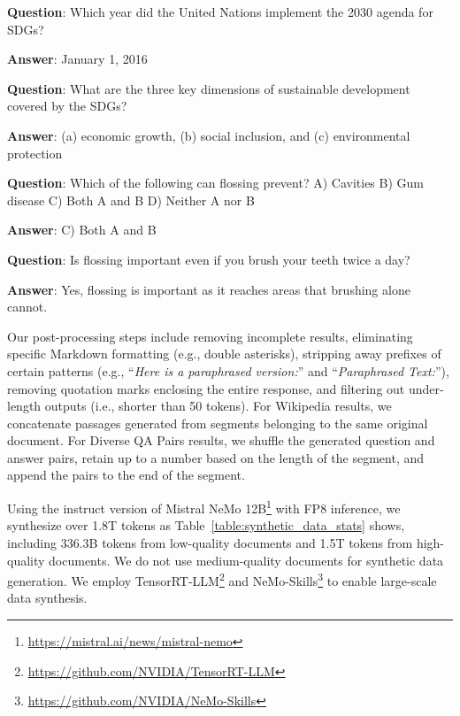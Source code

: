\documentclass[11pt]{article}
\begin{document}
\begin{tcolorbox}[boxsep=0mm,left=1mm,right=1mm,top=1mm,bottom=1mm,fontupper=\small\ttfamily,halign=left,arc=0mm,boxrule=1pt,colback=gray!10]
\textbf{Question}: Which year did the United Nations implement the 2030 agenda for SDGs?

\textbf{Answer}: January 1, 2016

\vspace{4pt}

\textbf{Question}: What are the three key dimensions of sustainable development covered by the SDGs?

\textbf{Answer}: (a) economic growth, (b) social inclusion, and (c) environmental protection

\vspace{4pt}

\textbf{Question}: Which of the following can flossing prevent? A) Cavities B) Gum disease C) Both A and B D) Neither A nor B

\textbf{Answer}: C) Both A and B

\vspace{4pt}

\textbf{Question}: Is flossing important even if you brush your teeth twice a day?

\textbf{Answer}: Yes, flossing is important as it reaches areas that brushing alone cannot.
\end{tcolorbox}
\noindent\begin{minipage}{\linewidth}
\end{minipage}

Our post-processing steps include removing incomplete results, eliminating specific Markdown formatting (e.g., double asterisks), stripping away prefixes of certain patterns (e.g., ``\textit{Here is a paraphrased version:}'' and ``\textit{Paraphrased Text:}''), removing quotation marks enclosing the entire response, and filtering out under-length outputs (i.e., shorter than 50 tokens).
For \textrm{Wikipedia} results, we concatenate passages generated from segments belonging to the same original document.
For \textrm{Diverse QA Pairs} results, we shuffle the generated question and answer pairs, retain up to a number based on the length of the segment, and append the pairs to the end of the segment.

Using the instruct version of Mistral NeMo 12B\footnote{\url{https://mistral.ai/news/mistral-nemo}} with FP8 inference, we synthesize over 1.8T tokens as Table~\ref{table:synthetic_data_stats} shows, including 336.3B tokens from low-quality documents and 1.5T tokens from high-quality documents. We do not use medium-quality documents for synthetic data generation. We employ TensorRT-LLM\footnote{\url{https://github.com/NVIDIA/TensorRT-LLM}} and NeMo-Skills\footnote{\url{https://github.com/NVIDIA/NeMo-Skills}} to enable large-scale data synthesis.
\end{document}
